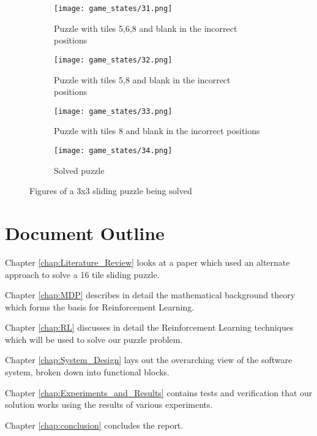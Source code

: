 \begin{figure}[!htb]
	\centering
	\begin{subfigure}{.4\textwidth}
		\centering
		\texttt{[image: game\_states/31.png]}
		\caption{Puzzle with tiles 5,6,8 and blank in the incorrect positions}
		\label{fig:sfig1}
	\end{subfigure}%
	\begin{subfigure}{.4\textwidth}
		\centering
		\texttt{[image: game\_states/32.png]}
		\caption{Puzzle with tiles 5,8 and blank in the incorrect positions}
		\label{fig:sfig2}
	\end{subfigure}
	\begin{subfigure}{.4\textwidth}
		\centering
		\texttt{[image: game\_states/33.png]}
		\caption{Puzzle with tiles 8 and blank in the incorrect positions}
		\label{fig:sfig3}
	\end{subfigure}
	\begin{subfigure}{.4\textwidth}
		\centering
		\texttt{[image: game\_states/34.png]}
		\caption{Solved puzzle}
		\label{fig:sfig4}
	\end{subfigure}
	\caption{Figures of a 3x3 sliding puzzle being solved}
	\label{fig:sliding_puzzle_figs}
\end{figure}

\section{Document Outline} 
Chapter \ref{chap:Literature_Review} looks at a paper which used an alternate approach to solve a 16 tile sliding puzzle.

Chapter \ref{chap:MDP} describes in detail the mathematical background theory which forms the basis for Reinforcement Learning.

Chapter \ref{chap:RL} discusses in detail the Reinforcement Learning techniques which will be used to solve our puzzle problem.

Chapter \ref{chap:System_Design} lays out the overarching view of the software system, broken down into functional blocks.

Chapter \ref{chap:Experiments_and_Results} contains tests and verification that our solution works using the results of various experiments.

Chapter \ref{chap:conclusion} concludes the report.